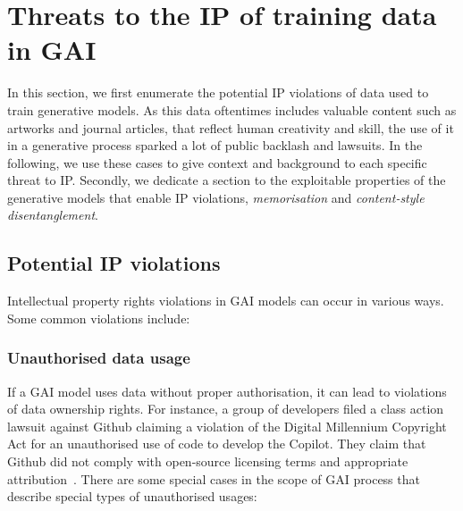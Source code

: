 \documentclass[conference]{IEEEtran}
\begin{document}
\section{Threats to the IP of training data in GAI}\label{sec:IPR-threats}
In this section, we first enumerate the potential IP violations of data used to train generative models. 
As this data oftentimes includes valuable content such as artworks and journal articles, that reflect human creativity and skill, the use of it in a generative process sparked a lot of public backlash and lawsuits. In the following, we use these cases to give context and background to each specific threat to IP. 
Secondly, we dedicate a section to the exploitable properties of the generative models that enable IP violations, \textit{memorisation} and \textit{content-style disentanglement}. %
\subsection{Potential IP violations}
Intellectual property rights violations in GAI models can occur in various ways. Some common violations include:


\subsubsection{Unauthorised data usage}
 If a GAI model uses data without proper authorisation, it can lead to violations of data ownership rights. For instance, a group of developers filed a class action lawsuit against Github claiming a violation of the Digital Millennium Copyright Act for an unauthorised use of code to develop the Copilot. They claim that Github did not comply with open-source licensing terms and appropriate attribution~\cite{losio_first_2022}.
    There are some special cases in the scope of GAI process that describe special types of unauthorised usages:
\end{document}
